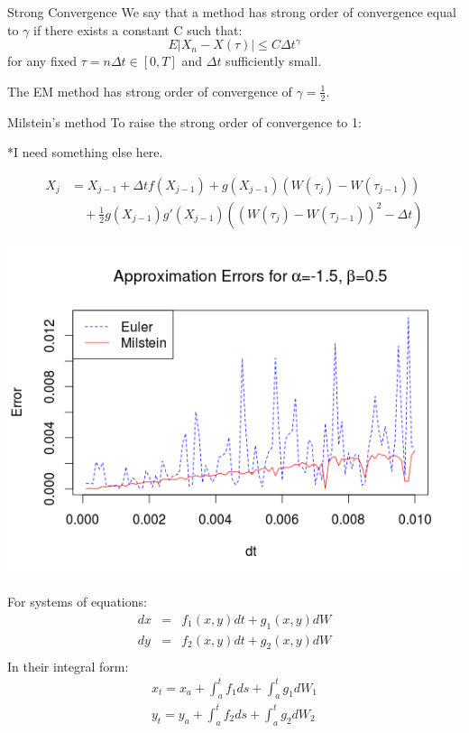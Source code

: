 \begin{frame}
\begin{block}{Strong Convergence}
We say that a method has strong order of convergence equal to $\gamma$ if there exists a constant C such that:
$$E|X_n-X(\tau)|\leq C \Delta t^\gamma$$
for any fixed $\tau=n \Delta t \in [0,T]$ and $\Delta t$ sufficiently small.
\end{block}
\bigskip
The EM method has strong order of convergence of $\gamma=\frac{1}{2}$.
\end{frame}

\begin{frame}{Milstein's method}
To raise the strong order of convergence to 1:	

*I need something else here.

	\begin{equation*}
	\begin{split}
	X_{j} & =X_{j-1}+\Delta t f(X_{j-1})+g(X_{j-1})(W(\tau_j)-W(\tau_{j-1}))\\
	  &\quad +\frac{1}{2}g(X_{j-1})g'(X_{j-1})((W(\tau_j)-W(\tau_{j-1}))^2-\Delta t)
	\end{split}
	\end{equation*}
\end{frame}

\begin{frame}
	\begin{center}
	\includegraphics[scale=0.55]{alpham15_beta05.png} 
	\end{center}
\end{frame}

\begin{frame}
For systems of equations:
	\begin{eqnarray*}
		dx&=&f_1(x,y)dt+g_1(x,y)dW\\
		dy&=&f_2(x,y)dt+g_2(x,y)dW\\
	\end{eqnarray*}
In their integral form:
	\begin{eqnarray*}
		x_t=x_a+\int_{a}^{t}f_1 ds+\int_{a}^{t}g_1dW_1\\
		y_t=y_a+\int_{a}^{t}f_2 ds+\int_{a}^{t}g_2dW_2\\
	\end{eqnarray*}	
\end{frame}


